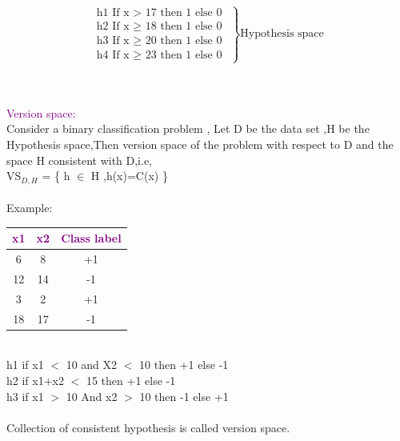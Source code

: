 $$
 \left.
    \begin{array}{ll}
  \mbox{h1 If  x  $>$ 17 then 1 else 0 }        \\
  \mbox{h2  If  x $\geq$ 18 then 1 else 0 }     \\
  \mbox{h3 If  x $\geq$  20 then 1 else 0}      \\
  \mbox{h4 If  x  $\geq$ 23 then 1 else 0}
  \end{array}
\right \}\mbox{Hypothesis space}
$$

\\
\\
{\textcolor{purple}{Version space:}}
\\
Consider a binary classification problem ,
Let D be the data set ,H be the Hypothesis space,Then version space of the problem with respect to D and the space H consistent with D,i.e,\\
VS$_{D,H}$ = \{ h $\in$  H ,h(x)=C(x) \}\\
\\

Example:
 \begin{table}[h]                           
 \centering
    \begin{tabular}{|c|c|c|}
    \hline
  \textcolor{purple}{x1}    &  \textcolor{purple}{x2} &    \textcolor{purple}{Class label}            \\ \hline
  6      &   8    & +1         \\ \hline          
     12    &  14  & -1 \\ \hline
      3   &   2   & +1      \\ \hline
     18    &   17 & -1        \\ \hline

    \end{tabular}
    \label{tab:msg1}                            

\end{table}\\

h1 if  x1 $<$ 10 and X2 $<$ 10  then +1 else -1\\
h2 if x1+x2 $<$ 15 then +1 else -1\\
h3 if x1 $>$ 10 And  x2 $>$ 10 then -1 else +1\\
\\
Collection of consistent hypothesis is called version space.
